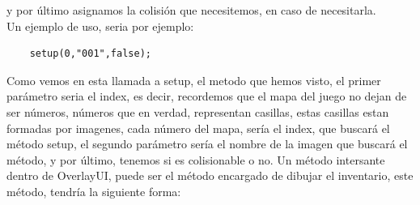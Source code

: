 \documentclass[a4paper]{article}
\begin{document}
y por último asignamos la colisión que necesitemos, en caso de necesitarla.\\
Un ejemplo de uso, seria por ejemplo:
\begin{lstlisting}
    setup(0,"001",false);
\end{lstlisting}
Como vemos en esta llamada a setup, el metodo que hemos visto, el primer parámetro seria el index, es decir, recordemos que el mapa del juego no dejan de ser números, números que en verdad, representan casillas, estas casillas estan formadas por imagenes,
cada número del mapa, sería el index, que buscará el método setup, el segundo parámetro sería el nombre de la imagen que buscará el método, y por último, tenemos si es colisionable o no.
\clearpage
Un método intersante dentro de OverlayUI, puede ser el método encargado de dibujar el inventario, este método, tendría la siguiente forma:
\end{document}
